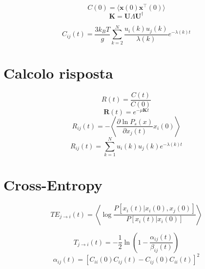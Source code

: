 \documentclass{article}
\begin{document}
\begin{equation}
    C(0) = \langle \mathbf{x}(0) \mathbf{x}^\top(0) \rangle
    \end{equation}
\begin{equation}
    \mathbf{K} = \mathbf{U} \Lambda \mathbf{U}^\dagger
    \end{equation}
        
\begin{equation}
    C_{ij}(t) = \frac{3 k_B T}{g} \sum_{k=2}^{N} \frac{u_i(k) u_j(k)}{\lambda(k)} e^{-\lambda(k) t}
    \end{equation}
        
\section{Calcolo risposta}
\begin{equation}
    R(t) = \frac{C(t)}{C(0)}
    \end{equation}
\begin{equation}
    \mathbf{R}(t) = e^{-\mu \mathbf{K} t}
    \end{equation}
\begin{equation}
    R_{ij}(t) = - \left\langle \frac{\partial \ln P_s(x)}{\partial x_j(t)} x_i(0) \right\rangle
    \end{equation}
\begin{equation}
    R_{ij}(t) = \sum_{k=1}^{N} u_i(k) u_j(k) e^{-\lambda(k) t}
    \end{equation}


\section{Cross-Entropy}
\begin{equation}
    TE_{j \rightarrow i}(t) = \left\langle \log \frac{P[x_i(t) | x_i(0), x_j(0)]}{P[x_i(t) | x_i(0)]} \right\rangle
    \end{equation}
        
\begin{equation}
    T_{j \rightarrow i}(t) = - \frac{1}{2} \ln \left( 1 - \frac{\alpha_{ij}(t)}{\beta_{ij}(t)} \right)
    \end{equation}
\begin{equation}
    \alpha_{ij}(t) = [C_{ii}(0) C_{ij}(t) - C_{ij}(0) C_{ii}(t)]^2
    \end{equation}
        
\end{document}
